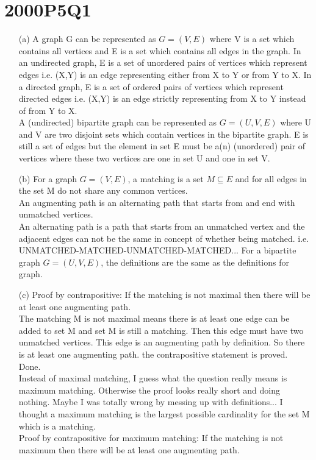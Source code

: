 \documentclass[10pt,twoside,a4paper]{article}
\begin{document}
\section{2000P5Q1}
\begin{itemize}
\item[(a)]
A graph G can be represented as $G=(V,E)$ where V is a set which contains all vertices and E is a set which contains all edges in the graph. In an undirected graph, E is a set of unordered pairs of vertices which represent edges i.e. (X,Y) is an edge representing either from X to Y or from Y to X. In a directed graph, E is a set of ordered pairs of vertices which represent directed edges i.e. (X,Y) is an edge strictly representing from X to Y instead of from Y to X.
\\A (undirected) bipartite graph can be represented as $G=(U,V,E)$ where U and V are two disjoint sets which contain vertices in the bipartite graph. E is still a set of edges but the element in set E must be a(n) (unordered) pair of vertices where these two vertices are one in set U and one in set V.
\item[(b)]
For a graph $G=(V,E)$, a matching is a set $M\subseteq E$ and for all edges in the set M do not share any common vertices.
\\An augmenting path is an alternating path that starts from and end with unmatched vertices.
\\An alternating path is a path that starts from an unmatched vertex and the adjacent edges can not be the same in concept of whether being matched. i.e. UNMATCHED-MATCHED-UNMATCHED-MATCHED...
For a bipartite graph $G=(U,V,E)$, the definitions are the same as the definitions for graph.
\item[(c)]
Proof by contrapositive: If the matching is not maximal then there will be at least one augmenting path.
\\The matching M is not maximal means there is at least one edge can be added to set M and set M is still a matching. Then this edge must have two unmatched vertices. This edge is an augmenting path by definition. So there is at least one augmenting path. the contrapositive statement is proved. Done.
\\Instead of maximal matching, I guess what the question really means is maximum matching. Otherwise the proof looks really short and doing nothing. Maybe I was totally wrong by messing up with definitions... I thought a maximum matching is the largest possible cardinality for the set M which is a matching.
\\Proof by contrapositive for maximum matching: If the matching is not maximum then there will be at least one augmenting path.

\end{itemize}
\end{document}
